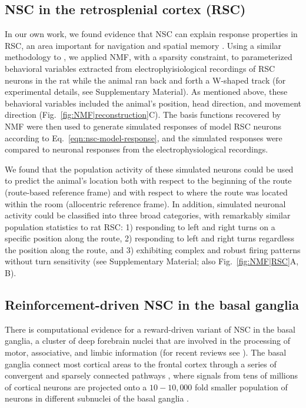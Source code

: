 \subsection*{NSC in the retrosplenial cortex (RSC)}

In our own work, we found evidence that \ac{NSC} 
can explain response properties in \ac{RSC}, 
an area important for navigation and spatial memory 
\cite{Miller2014,Nelson2015,VannAggleton2009}.
Using a similar methodology to \cite{Beyeler2016},
we applied \ac{NMF}, with a sparsity constraint,
to parameterized behavioral variables extracted from electrophyisiological recordings
of \ac{RSC} neurons in the rat \cite{AlexanderNitz2015}
while the animal ran back and forth a W-shaped track
(for experimental details, see Supplementary Material).
As mentioned above, these behavioral variables included the animal's position, head direction, 
and movement direction (Fig.~\ref{fig:NMF|reconstruction}C).
The basis functions recovered by \ac{NMF} were then used to generate simulated responses
of model \ac{RSC} neurons according to Eq.~\ref{eqn:nsc-model-response},
and the simulated responses were compared to neuronal responses 
from the electrophysiological recordings.

We found that the population activity of these simulated neurons could be used to predict
the animal's location both with respect to the beginning of the route
(route-based reference frame)
and with respect to where the route was located within the room
(allocentric reference frame).
In addition, simulated neuronal activity could be classified into three broad categories,
with remarkably similar population statistics to rat \ac{RSC}:
1) responding to left and right turns on a specific position along the route,
2) responding to left and right turns regardless the position along the route,
and 3) exhibiting complex and robust firing patterns without turn sensitivity
(see Supplementary Material; also Fig.~\ref{fig:NMF|RSC}A, B).


\subsection*{Reinforcement-driven NSC in the basal ganglia}

There is computational evidence 
for a reward-driven variant of \ac{NSC} in the basal ganglia, 
a cluster of deep forebrain nuclei that are involved in the 
processing of motor, associative, and limbic information
(for recent reviews see \cite{BarGad2003_Review,NelsonKreitzer2014}).
The basal ganglia connect most cortical areas to the frontal cortex through
a series of convergent and sparsely connected pathways \cite{schwab2015},
where signals from tens of millions of cortical neurons are projected
onto a $10 - 10,000$ fold smaller population of neurons in different subnuclei
of the basal ganglia \cite{BarGad2003_Review}.

